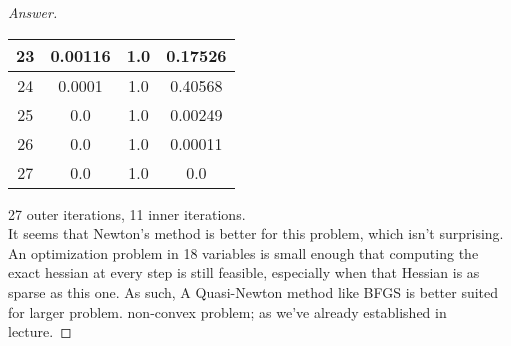 \documentclass{article}
\begin{document}
\begin{proof}[Answer]
\begin{center}
\begin{tabular}{|c|c|c|c|}
        \hline
        23 & 0.00116 & 1.0 & 0.17526 \\ 
        \hline
        24 & 0.0001 & 1.0 & 0.40568 \\ 
        \hline
        25 & 0.0 & 1.0 & 0.00249 \\ 
        \hline
        26 & 0.0 & 1.0 & 0.00011 \\ 
        \hline
        27 & 0.0 & 1.0 & 0.0 \\ 
        \hline
        \end{tabular}
        \end{center}
        27 outer iterations,
        11 inner iterations. \\
        It seems that Newton's method is better for this
        problem, which isn't surprising. An optimization
        problem in 18 variables is small enough that computing
        the exact hessian at every step is still feasible,
        especially when that Hessian is as sparse as this one.
        As such, A Quasi-Newton method like BFGS is better suited 
        for larger problem. non-convex problem; as we've already 
        established in lecture.
        \end{proof}
\end{document}
